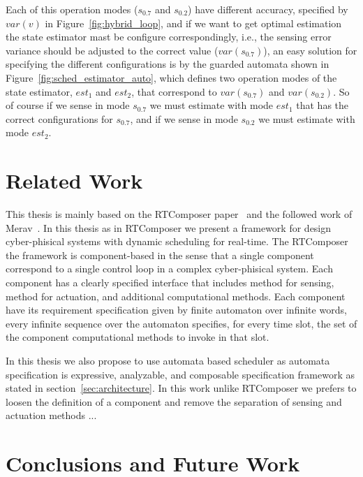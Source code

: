 \documentclass[ twoside, 12pt ]{article}
\begin{document}
{Each of this operation modes ($s_{0.7}$ and $s_{0.2}$) have different accuracy, specified by $var(v)$ in Figure~\ref{fig:hybrid_loop}, and if we want to get optimal estimation the state estimator mast be configure correspondingly, i.e., the sensing error variance should be adjusted to the correct value ($var(s_{0.7})$), an easy solution for specifying the different configurations is by the guarded automata shown in Figure~\ref{fig:sched_estimator_auto}, which defines two operation modes of the state estimator, $est_1$ and $est_2$, that correspond to $var(s_{0.7})$ and $var(s_{0.2})$. So of course if we sense in mode $s_{0.7}$ we must estimate with mode $est_1$ that has the correct configurations for $s_{0.7}$, and if we sense in mode $s_{0.2}$ we must estimate with mode $est_2$.    
}



\section{Related Work}

This thesis is mainly based on the RTComposer paper~\cite{RTComposer} and the followed work of Merav~\cite{Merav}.
In this thesis as in RTComposer we present a framework for design cyber-phisical systems with dynamic scheduling for real-time.
The RTComposer the framework is component-based in the sense that a single component correspond to a single control loop in a complex cyber-phisical system.
Each component has a clearly specified interface that includes method for sensing, method for actuation, and additional computational methods.
Each component have its requirement specification given by finite automaton over infinite words, every infinite sequence over the automaton specifies, for every time slot, the set of the component computational methods to invoke in that slot.

In this thesis we also propose to use automata based scheduler as automata specification is expressive, analyzable, and composable specification framework as stated in section~\ref{sec:architecture}.
In this work unlike RTComposer we prefers to loosen the definition of a component and remove the separation of  sensing and actuation methods ...



\section{Conclusions and Future Work}
\end{document}
